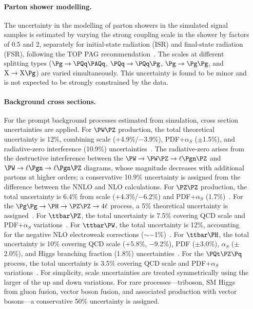 \paragraph{Parton shower modelling.}
The uncertainty in the modelling of parton showers in the simulated signal samples is estimated by varying the strong coupling scale in the shower by factors of 0.5 and 2, separately for initial-state radiation (ISR) and final-state radiation (FSR), following the TOP PAG recommendation~\cite{TopPSSyst}. The scales at different splitting types ($\Pg \to \PQq\PAQq$, $\PQq \to \PQq\Pg$, $\Pg \to \Pg\Pg$, and $\mathrm{X} \to \mathrm{X}\Pg$) are varied simultaneously. This uncertainty is found to be minor and is not expected to be strongly constrained by the data.

\paragraph{Background cross sections.}
For the prompt background processes estimated from simulation, cross section uncertainties are applied. For $\PW\PZ$ production, the total theoretical uncertainty is 12\%, combining scale (+4.9\%/$-$3.9\%), PDF+$\alpha_{S}$ ($\pm$1.5\%), and radiative-zero interference (10.9\%) uncertainties~\cite{WZNNLOCalc}. The radiative-zero arises from the destructive interference between the $\PW \to \PW\PZ \to \ell\Pgn\PZ$ and $\PW \to \ell\Pgn \to \ell\Pgn\PZ$ diagrams, whose magnitude decreases with additional partons at higher orders; a conservative 10.9\% uncertainty is assigned from the difference between the NNLO and NLO calculations. For $\PZ\PZ$ production, the total uncertainty is 6.4\% from scale (+4.3\%/$-$6.2\%) and PDF+$\alpha_{S}$ (1.7\%)~\cite{ZZNNLOCalc}. For the $\Pg\Pg \to \PH \to \PZ\PZ \to 4\ell$ process, a 5\% theoretical uncertainty is assigned~\cite{YR4}. For $\ttbar\PZ$, the total uncertainty is 7.5\% covering QCD scale and PDF+$\alpha_{S}$ variations~\cite{ttZaN3LO}. For $\ttbar\PW$, the total uncertainty is 12\%, accounting for the negative NLO electroweak corrections ($\sim$$-$1\%)~\cite{ttWaN3LO,ttWEW}. For $\ttbar\PH$, the total uncertainty is 10\% covering QCD scale (+5.8\%, $-$9.2\%), PDF ($\pm$3.0\%), $\alpha_{S}$ ($\pm$2.0\%), and Higgs branching fraction (1.8\%) uncertainties~\cite{YR4}. For the $\PQt\PZ\Pq$ process, the total uncertainty is 3.5\% covering QCD scale and PDF+$\alpha_{S}$ variations~\cite{tZqNLO}. For simplicity, scale uncertainties are treated symmetrically using the larger of the up and down variations. For rare processes---triboson, SM Higgs from gluon fusion, vector boson fusion, and associated production with vector bosons---a conservative 50\% uncertainty is assigned.

